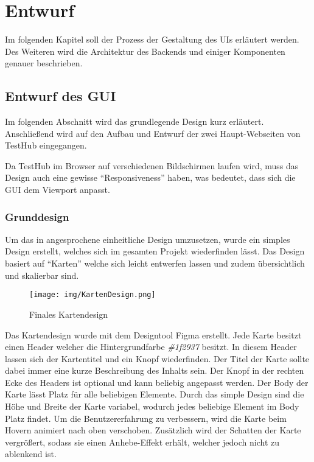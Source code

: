 \section{Entwurf}\label{sec:entwurf}
Im folgenden Kapitel soll der Prozess der Gestaltung des \gls{UI}s erläutert 
werden. Des Weiteren wird die Architektur des \gls{Backend}s und einiger Komponenten
genauer beschrieben.

\subsection{Entwurf des GUI}
Im folgenden Abschnitt wird das grundlegende Design kurz erläutert. Anschließend
wird auf den Aufbau und Entwurf der zwei Haupt-Webseiten von TestHub eingegangen. 

Da TestHub im Browser auf verschiedenen Bildschirmen laufen wird, muss das 
Design auch eine gewisse ``Responsiveness'' haben, was bedeutet, dass sich die 
GUI dem Viewport anpasst.

\subsubsection{Grunddesign}\label{sec:grunddesign}
Um das in  angesprochene einheitliche Design umzusetzen, 
wurde ein simples Design erstellt, welches sich im gesamten Projekt wiederfinden
lässt. Das Design basiert auf ``Karten'' welche sich leicht entwerfen lassen und
zudem übersichtlich und skalierbar sind.

\begin{figure}[H]
    \texttt{[image: img/KartenDesign.png]}
    \caption{Finales Kartendesign}\label{fig:card}
\end{figure}

Das Kartendesign wurde mit dem Designtool Figma erstellt. Jede Karte besitzt 
einen Header welcher die Hintergrundfarbe \textit{\#1f2937} besitzt. In diesem
Header lassen sich der Kartentitel und ein Knopf wiederfinden.
Der Titel der Karte sollte dabei immer eine kurze Beschreibung des Inhalts sein.
Der Knopf in der rechten Ecke des Headers ist optional und kann beliebig 
angepasst werden. Der Body der Karte lässt Platz für alle beliebigen Elemente.
Durch das simple Design sind die Höhe und Breite der Karte variabel, wodurch 
jedes beliebige Element im Body Platz findet. Um die Benutzererfahrung zu verbessern,
wird die Karte beim Hovern animiert nach oben verschoben. 
Zusätzlich wird der Schatten der Karte vergrößert, sodass sie einen Anhebe-Effekt
erhält, welcher jedoch nicht zu ablenkend ist.

